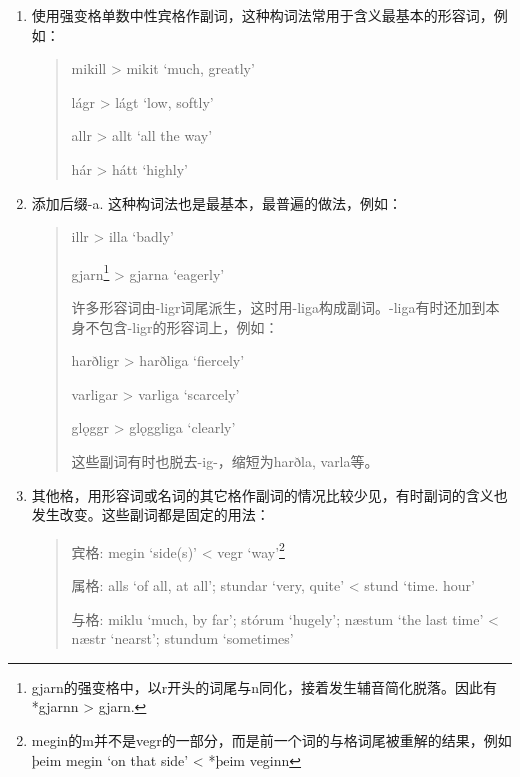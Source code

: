 \begin{enumerate}
    \item
          使用强变格单数中性宾格作副词，这种构词法常用于含义最基本的形容词，例如：

          \begin{quote}
              mikill > mikit `much, greatly‌'

              lágr > lágt `low, softly‌'

              allr > allt `all the way‌'

              hár > hátt `highly‌'
          \end{quote}

    \item
          添加后缀-a. 这种构词法也是最基本，最普遍的做法，例如：

          \begin{quote}
              illr > illa `badly‌'

              gjarn\footnote{gjarn的强变格中，以r开头的词尾与n同化，接着发生辅音简化脱落。因此有*gjarnn
                  > gjarn.} > gjarna `eagerly‌'

              许多形容词由-ligr词尾派生，这时用-liga构成副词。-liga有时还加到本身不包含-ligr的形容词上，例如：

              harðligr > harðliga `fiercely‌'

              varligar > varliga `scarcely‌'

              glǫggr > glǫggliga `clearly'

              这些副词有时也脱去-ig-，缩短为harðla, varla等。
          \end{quote}

    \item
          其他格，用形容词或名词的其它格作副词的情况比较少见，有时副词的含义也发生改变。这些副词都是固定的用法：

          \begin{quote}
              宾格: megin `side(s)‌' < vegr `way‌'\footnote{megin的m并不是vegr的一部分，而是前一个词的与格词尾被重解的结果，例如þeim megin `on that side' < *þeim veginn}

              属格: alls `of all, at all‌'; stundar `very, quite‌' < stund `time. hour'

              与格: miklu `much, by far‌'; stórum `hugely‌'; næstum `the last time‌' < næstr `nearst'; stundum `sometimes‌'

          \end{quote}
\end{enumerate}

